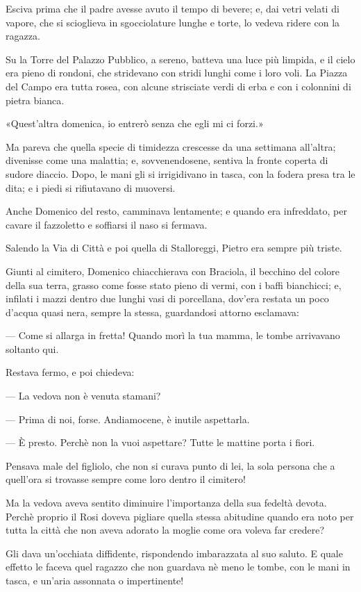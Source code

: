 Esciva prima che il padre avesse avuto il tempo di bevere; e, dai vetri velati di vapore, che si scioglieva in sgocciolature lunghe e torte, lo vedeva ridere con la ragazza.

Su la Torre del Palazzo Pubblico, a sereno, batteva una luce più limpida, e il cielo era pieno di rondoni, che stridevano con stridi lunghi come i loro voli. La Piazza del Campo era tutta rosea, con alcune strisciate verdi di erba e con i colonnini di pietra bianca.

«Quest'altra domenica, io entrerò senza che egli mi ci forzi.»

Ma pareva che quella specie di timidezza crescesse da una settimana all'altra; divenisse come una malattia; e, sovvenendosene, sentiva la fronte coperta di sudore diaccio. Dopo, le mani gli si irrigidivano in tasca, con la fodera presa tra le dita; e i piedi si rifiutavano di muoversi.

Anche Domenico del resto, camminava lentamente; e quando era infreddato, per cavare il fazzoletto e soffiarsi il naso si fermava.

Salendo la Via di Città e poi quella di Stalloreggi, Pietro era sempre più triste.

Giunti al cimitero, Domenico chiacchierava con Braciola, il becchino del colore della sua terra, grasso come fosse stato pieno di vermi, con i baffi bianchicci; e, infilati i mazzi dentro due lunghi vasi di porcellana, dov'era restata un poco d'acqua quasi nera, sempre la stessa, guardandosi attorno esclamava:

— Come si allarga in fretta! Quando morì la tua mamma, le tombe arrivavano soltanto qui.

Restava fermo, e poi chiedeva:

— La vedova non è venuta stamani?

— Prima di noi, forse. Andiamocene, è inutile aspettarla.

— È presto. Perchè non la vuoi aspettare? Tutte le mattine porta i fiori.

Pensava male del figliolo, che non si curava punto di lei, la sola persona che a quell'ora si trovasse sempre come loro dentro il cimitero!

Ma la vedova aveva sentito diminuire l'importanza della sua fedeltà devota. Perchè proprio il Rosi doveva pigliare quella stessa abitudine quando era noto per tutta la città che non aveva adorato la moglie come ora voleva far credere?

Gli dava un'occhiata diffidente, rispondendo imbarazzata al suo saluto. E quale effetto le faceva quel ragazzo che non guardava nè meno le tombe, con le mani in tasca, e un'aria assonnata o impertinente!

